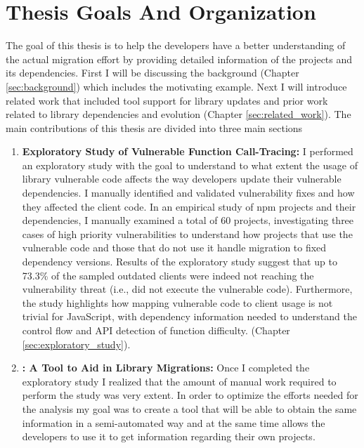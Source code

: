 \section{Thesis Goals And Organization}
The goal of this thesis is to help the developers have a better understanding of the actual migration effort by providing detailed information of the projects and its dependencies.
First I will be discussing the background (Chapter \ref{sec:background}) which includes the motivating example. 
Next I will introduce related work that included tool support for library updates and prior work related to library dependencies and evolution (Chapter \ref{sec:related_work}).
The main contributions of this thesis are divided into three main sections
\begin{enumerate}
    \item \textbf{Exploratory Study of Vulnerable Function Call-Tracing:} I performed an exploratory study with the goal to understand to what extent the usage of library vulnerable code affects the way developers update their vulnerable dependencies. 
    I manually identified and validated vulnerability fixes and how they affected the client code. 
    In an empirical study of npm projects and their dependencies, I manually examined a total of 60 projects, investigating three cases of high priority vulnerabilities to understand how projects that use the vulnerable code and those that do not use it handle migration to fixed dependency versions. 
    Results of the exploratory study suggest that up to 73.3\% of the sampled outdated clients were indeed not reaching the vulnerability threat (i.e., did not execute the vulnerable code). 
    Furthermore, the study highlights how mapping vulnerable code to client usage is not trivial for JavaScript, with dependency information needed to understand the control flow and API detection of function difficulty. (Chapter \ref{sec:exploratory_study}).
    \item \textbf{\tool[]: A Tool to Aid in Library Migrations:} Once I completed the exploratory study I realized that the amount of manual work required to perform the study was very extent. In order to optimize the efforts needed for the analysis my goal was to create a tool that will be able to obtain the same information in a semi-automated way and at the same time allows the developers to use it to get information regarding their own projects. 

\end{enumerate}
